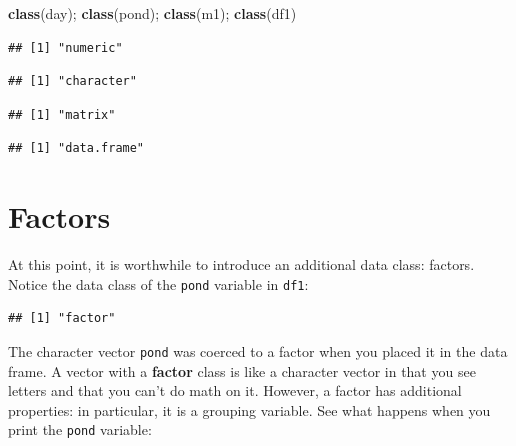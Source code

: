 \documentclass[]{book}
\newenvironment{Shaded}{\begin{snugshade}}{\end{snugshade}}
\newcommand{\KeywordTok}[1]{\textcolor[rgb]{0.13,0.29,0.53}{\textbf{#1}}}
\newcommand{\OperatorTok}[1]{\textcolor[rgb]{0.81,0.36,0.00}{\textbf{#1}}}
\newcommand{\NormalTok}[1]{#1}
\theoremstyle{definition}
\theoremstyle{definition}
\theoremstyle{definition}
\theoremstyle{remark}
\begin{document}
\begin{Shaded}
\begin{Highlighting}[]
\KeywordTok{class}\NormalTok{(day); }\KeywordTok{class}\NormalTok{(pond); }\KeywordTok{class}\NormalTok{(m1); }\KeywordTok{class}\NormalTok{(df1)}
\end{Highlighting}
\end{Shaded}

\begin{verbatim}
## [1] "numeric"
\end{verbatim}

\begin{verbatim}
## [1] "character"
\end{verbatim}

\begin{verbatim}
## [1] "matrix"
\end{verbatim}

\begin{verbatim}
## [1] "data.frame"
\end{verbatim}

\section{Factors}\label{factors}

At this point, it is worthwhile to introduce an additional data class:
factors. Notice the data class of the \texttt{pond} variable in
\texttt{df1}:

\begin{Shaded}
\end{Shaded}

\begin{verbatim}
## [1] "factor"
\end{verbatim}

The character vector \texttt{pond} was coerced to a factor when you
placed it in the data frame. A vector with a \textbf{factor} class is
like a character vector in that you see letters and that you can't do
math on it. However, a factor has additional properties: in particular,
it is a grouping variable. See what happens when you print the
\texttt{pond} variable:

\begin{Shaded}
\end{Shaded}
\end{document}
